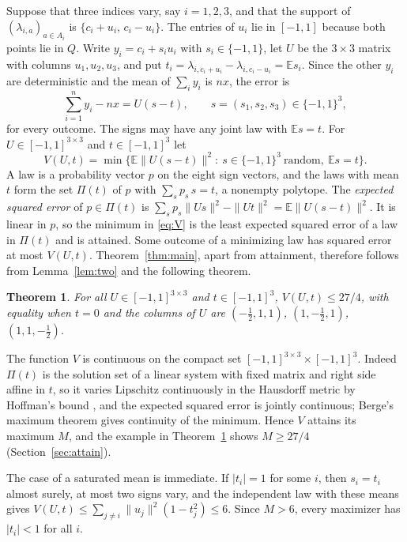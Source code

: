 \documentclass[11pt]{amsart}
\newtheorem{thm}{Theorem}[section]
\theoremstyle{remark}
\numberwithin{equation}{section}
\newcommand{\E}{\mathbb E}
\begin{document}
Suppose that three indices vary, say $i=1,2,3$, and that the support of $(\lambda_{i,a})_{a\in A_i}$ is $\{c_i+u_i,\,c_i-u_i\}$. The entries of $u_i$ lie in $[-1,1]$ because both points lie in $Q$. Write $y_i=c_i+s_iu_i$ with $s_i\in\{-1,1\}$, let $U$ be the $3\times3$ matrix with columns $u_1,u_2,u_3$, and put $t_i=\lambda_{i,c_i+u_i}-\lambda_{i,c_i-u_i}=\E s_i$. Since the other $y_i$ are deterministic and the mean of $\sum_iy_i$ is $nx$, the error is
\[
\sum_{i=1}^ny_i-nx=U(s-t),\qquad s=(s_1,s_2,s_3)\in\{-1,1\}^3,
\]
for every outcome. The signs may have any joint law with $\E s=t$. For $U\in[-1,1]^{3\times3}$ and $t\in[-1,1]^3$ let
\begin{equation}\label{eq:V}
V(U,t)=\min\bigl\{\E\|U(s-t)\|^2:\ s\in\{-1,1\}^3\ \text{random},\ \E s=t\bigr\}.
\end{equation}
A law is a probability vector $p$ on the eight sign vectors, and the laws with mean $t$ form the set $\Pi(t)$ of $p$ with $\sum_sp_s\,s=t$, a nonempty polytope. The \emph{expected squared error} of $p\in\Pi(t)$ is $\sum_sp_s\|Us\|^2-\|Ut\|^2=\E\|U(s-t)\|^2$. It is linear in $p$, so the minimum in \eqref{eq:V} is the least expected squared error of a law in $\Pi(t)$ and is attained. Some outcome of a minimizing law has squared error at most $V(U,t)$. Theorem~\ref{thm:main}, apart from attainment, therefore follows from Lemma~\ref{lem:two} and the following theorem.

\begin{thm}\label{thm:V}
For all $U\in[-1,1]^{3\times3}$ and $t\in[-1,1]^3$, $V(U,t)\le27/4$, with equality when $t=0$ and the columns of $U$ are $(-\frac12,1,1)$, $(1,-\frac12,1)$, $(1,1,-\frac12)$.
\end{thm}

The function $V$ is continuous on the compact set $[-1,1]^{3\times3}\times[-1,1]^3$. Indeed $\Pi(t)$ is the solution set of a linear system with fixed matrix and right side affine in $t$, so it varies Lipschitz continuously in the Hausdorff metric by Hoffman's bound \cite{Hoffman52}, and the expected squared error is jointly continuous; Berge's maximum theorem \cite[Chapter~17]{AliprantisBorder} gives continuity of the minimum. Hence $V$ attains its maximum $M$, and the example in Theorem~\ref{thm:V} shows $M\ge27/4$ (Section~\ref{sec:attain}).

The case of a saturated mean is immediate. If $|t_i|=1$ for some $i$, then $s_i=t_i$ almost surely, at most two signs vary, and the independent law with these means gives $V(U,t)\le\sum_{j\ne i}\|u_j\|^2(1-t_j^2)\le6$. Since $M>6$, every maximizer has $|t_i|<1$ for all $i$.
\end{document}
